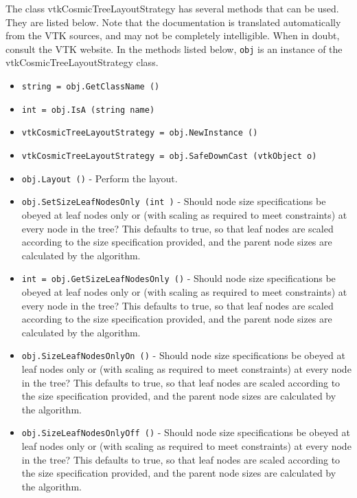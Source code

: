 The class vtkCosmicTreeLayoutStrategy has several methods that can be used.
  They are listed below.
Note that the documentation is translated automatically from the VTK sources,
and may not be completely intelligible.  When in doubt, consult the VTK website.
In the methods listed below, \verb|obj| is an instance of the vtkCosmicTreeLayoutStrategy class.
\begin{itemize}
\item  \verb|string = obj.GetClassName ()|

\item  \verb|int = obj.IsA (string name)|

\item  \verb|vtkCosmicTreeLayoutStrategy = obj.NewInstance ()|

\item  \verb|vtkCosmicTreeLayoutStrategy = obj.SafeDownCast (vtkObject o)|

\item  \verb|obj.Layout ()| -  Perform the layout.

\item  \verb|obj.SetSizeLeafNodesOnly (int )| -  Should node size specifications be obeyed at leaf nodes only or
 (with scaling as required to meet constraints) at every node in
 the tree?
 This defaults to true, so that leaf nodes are scaled according to
 the size specification provided, and the parent node sizes are
 calculated by the algorithm.

\item  \verb|int = obj.GetSizeLeafNodesOnly ()| -  Should node size specifications be obeyed at leaf nodes only or
 (with scaling as required to meet constraints) at every node in
 the tree?
 This defaults to true, so that leaf nodes are scaled according to
 the size specification provided, and the parent node sizes are
 calculated by the algorithm.

\item  \verb|obj.SizeLeafNodesOnlyOn ()| -  Should node size specifications be obeyed at leaf nodes only or
 (with scaling as required to meet constraints) at every node in
 the tree?
 This defaults to true, so that leaf nodes are scaled according to
 the size specification provided, and the parent node sizes are
 calculated by the algorithm.

\item  \verb|obj.SizeLeafNodesOnlyOff ()| -  Should node size specifications be obeyed at leaf nodes only or
 (with scaling as required to meet constraints) at every node in
 the tree?
 This defaults to true, so that leaf nodes are scaled according to
 the size specification provided, and the parent node sizes are
 calculated by the algorithm.


\end{itemize}
